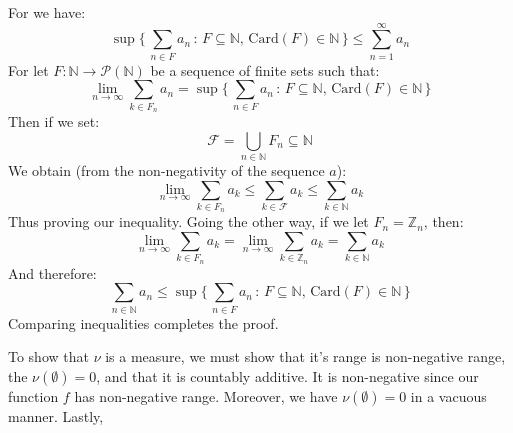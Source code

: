 \documentclass[crop=false,class=article]{standalone}                           %
\begin{document}
    \begin{solution}
        For we have:
        \begin{equation}
            \sup\Big\{\,\sum_{n\in{F}}a_{n}\,:\,F\subseteq\mathbb{N},\,
                \textrm{Card}(F)\in\mathbb{N}\,\Big\}
            \leq\sum_{n=1}^{\infty}a_{n}
        \end{equation}
        For let $F:\mathbb{N}\rightarrow\mathcal{P}(\mathbb{N})$ be a sequence
        of finite sets such that:
        \begin{equation}
            \underset{n\rightarrow\infty}{\lim}
                \sum_{k\in{F}_{n}}a_{n}
            =\sup\Big\{\,\sum_{n\in{F}}a_{n}\,:\,F\subseteq\mathbb{N},\,
                \textrm{Card}(F)\in\mathbb{N}\,\Big\}
        \end{equation}
        Then if we set:
        \begin{equation}
            \mathcal{F}=\bigcup_{n\in\mathbb{N}}F_{n}\subseteq\mathbb{N}
        \end{equation}
        We obtain (from the non-negativity of the sequence $a$):
        \begin{equation}
            \underset{n\rightarrow\infty}{\lim}\sum_{k\in{F}_{n}}a_{k}
                \leq\sum_{k\in\mathcal{F}}a_{k}
                \leq\sum_{k\in\mathbb{N}}a_{k}
        \end{equation}
        Thus proving our inequality. Going the other way, if we let
        $F_{n}=\mathbb{Z}_{n}$, then:
        \begin{equation}
            \underset{n\rightarrow\infty}{\lim}\sum_{k\in{F}_{n}}a_{k}
            =\underset{n\rightarrow\infty}{\lim}\sum_{k\in\mathbb{Z}_{n}}a_{k}
            =\sum_{k\in\mathbb{N}}a_{k}
        \end{equation}
        And therefore:
        \begin{equation}
            \sum_{n\in\mathbb{N}}a_{n}\leq
            \sup\Big\{\,\sum_{n\in{F}}a_{n}\,:\,F\subseteq\mathbb{N},\,
                \textrm{Card}(F)\in\mathbb{N}\,\Big\}
        \end{equation}
        Comparing inequalities completes the proof.
        \par\hfill\par
        To show that $\nu$ is a measure, we must show that it's range is
        non-negative range, the $\nu(\emptyset)=0$, and that it is countably
        additive. It is non-negative since our function $f$ has non-negative
        range. Moreover, we have $\nu(\emptyset)=0$ in a vacuous manner. Lastly,

\end{solution}
\end{document}
